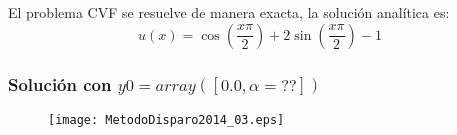 \begin{frame}
El problema CVF se resuelve de manera exacta, la solución analítica es:
\begin{equation}
u(x) = \cos\left(\frac{x \pi}{2}\right) + 2 \sin \left(\frac{x \pi}{2}\right) -1
\end{equation}
\end{frame}
\begin{frame}[fragile]
\frametitle{Solución con $y0 = array([0.0,\alpha=??])$}
\begin{figure}
	\centering
	\texttt{[image: MetodoDisparo2014\_03.eps]}
\end{figure}
\end{frame}
